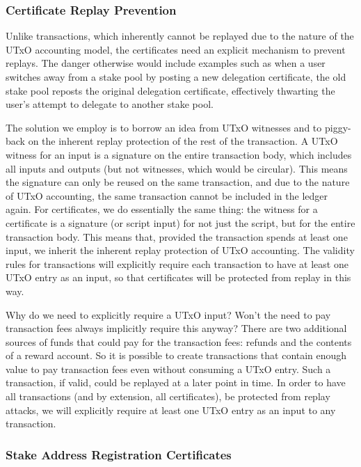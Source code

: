 \documentclass[11pt,a4paper,dvipsnames,twosided]{article}
\begin{document}
\subsubsection{Certificate Replay Prevention}
\label{certificate-replay-prevention}

Unlike transactions, which inherently cannot be replayed due to the nature of
the UTxO accounting model, the certificates need an explicit mechanism to
prevent replays. The danger otherwise would include examples such as when a user
switches away from a stake pool by posting a new delegation certificate, the old
stake pool reposts the original delegation certificate, effectively thwarting
the user's attempt to delegate to another stake pool.

The solution we employ is to borrow an idea from UTxO witnesses and to
piggy-back on the inherent replay protection of the rest of the
transaction. A UTxO witness for an input is a signature on the entire
transaction body, which includes all inputs and outputs (but
not witnesses, which would be circular). This means the signature can only be reused
on the same transaction, and due to the nature of UTxO accounting, the
same transaction cannot be included in the ledger again.
%
For certificates, we do essentially the same thing: the witness for a
certificate is a signature (or script input) for not just the script, but for the entire
transaction body. This means that, provided the transaction spends at
least one input, we inherit the inherent replay protection of UTxO
accounting. The validity rules for transactions will explicitly require each
transaction to have at least one UTxO entry as an input, so that certificates
will be protected from replay in this way.

Why do we need to explicitly require a UTxO input? Won't the need to pay
transaction fees always implicitly require this anyway? There are two
additional sources of funds that could pay for the transaction fees: refunds and
the contents of a reward account. So it is possible to create transactions that
contain enough value to pay transaction fees even without consuming a UTxO
entry. Such a transaction, if valid, could be replayed at a later point in time.
In order to have all transactions (and by extension, all certificates), be
protected from replay attacks, we will explicitly require at least one UTxO
entry as an input to any transaction.

\subsubsection{Stake Address Registration Certificates}
\label{stake-address-registration-certificates}
\end{document}
